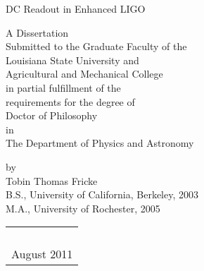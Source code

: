 \thispagestyle{empty}
\begin{center}
DC Readout in Enhanced LIGO
\vspace{1.75in}

A Dissertation\\
\vspace{1ex}
Submitted to the Graduate Faculty of the\\
Louisiana State University and\\
Agricultural and Mechanical College\\
in partial fulfillment of the\\
requirements for the degree of\\
Doctor of Philosophy\\
\vspace{1ex}
in\\
\vspace{1ex}
The Department of Physics and Astronomy\\

\vspace{1.75in}

by\\
Tobin Thomas Fricke \\
B.S., University of California, Berkeley, 2003\\
M.A., University of Rochester, 2005 \\

\begin{tabular}{c}
\\
\\
\\
\\
\\
August 2011
\end{tabular}

\end{center}

